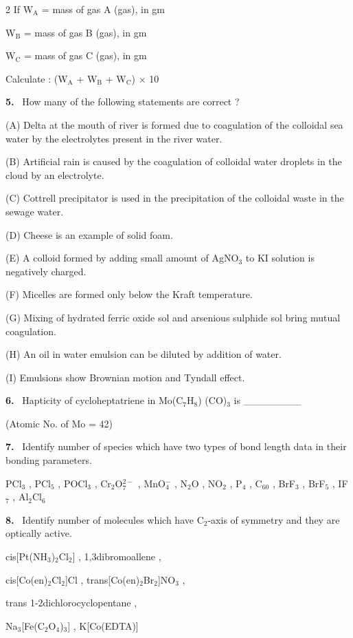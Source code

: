 \documentclass[10pt]{extarticle}
\newcommand{\qn}[1]{\par\smallskip\noindent\textbf{#1.}~}
\begin{document}
\begin{multicols}{2}
If W$_\text{A}$ = mass of gas A (gas), in gm\par
W$_\text{B}$ = mass of gas B (gas), in gm\par
W$_\text{C}$ = mass of gas C (gas), in gm\par
Calculate : (W$_\text{A}$ + W$_\text{B}$ + W$_\text{C}$) $\times$ 10\par
\qn{5} How many of the following statements are correct ?\par
(A) Delta at the mouth of river is formed due to coagulation of the colloidal sea water by the electrolytes present in the river water.\par
(B) Artificial rain is caused by the coagulation of colloidal water droplets in the cloud by an electrolyte.\par
(C) Cottrell precipitator is used in the precipitation of the colloidal waste in the sewage water.\par
(D) Cheese is an example of solid foam.\par
(E) A colloid formed by adding small amount of AgNO$_3$ to KI solution is negatively charged.\par
(F) Micelles are formed only below the Kraft temperature.\par
(G) Mixing of hydrated ferric oxide sol and arsenious sulphide sol bring mutual coagulation.\par
(H) An oil in water emulsion can be diluted by addition of water.\par
(I) Emulsions show Brownian motion and Tyndall effect.\par
\qn{6} Hapticity of cycloheptatriene in Mo(C$_7$H$_8$) (CO)$_3$ is \_\_\_\_\_\_\_\_\par
(Atomic No. of Mo = 42)\par
\qn{7} Identify number of species which have two types of bond length data in their bonding parameters.\par
PCl$_3$ , PCl$_5$ , POCl$_3$ , Cr$_2$O$_7^{2-}$ , MnO$_4^-$ , N$_2$O , NO$_2$ , P$_4$ , C$_{60}$ , BrF$_3$ , BrF$_5$ , IF$_7$ , Al$_2$Cl$_6$\par
\qn{8} Identify number of molecules which have C$_2$-axis of symmetry and they are optically active.\par
cis[Pt(NH$_3$)$_2$Cl$_2$] , 1,3dibromoallene ,\par
cis[Co(en)$_2$Cl$_2$]Cl , trans[Co(en)$_2$Br$_2$]NO$_3$ ,\par
trans 1-2dichlorocyclopentane ,\par
Na$_3$[Fe(C$_2$O$_4$)$_3$] , K[Co(EDTA)]\par

\end{multicols}
\end{document}
